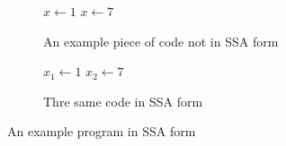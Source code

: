 \begin{figure}[h]
    \begin{subfigure}[b]{0.5\textwidth}
        \centering
        \begin{algorithmic}
            \State $x \gets 1$
            \State {}
            \State $x \gets 7$
            \State {}
        \end{algorithmic}
        \caption{An example piece of code not in SSA form}
    \end{subfigure}
    \begin{subfigure}[b]{0.5\textwidth}
        \centering
        \begin{algorithmic}
            \State $x_1 \gets 1$
            \State {}
            \State $x_2 \gets 7$
            \State {}
        \end{algorithmic}
        \caption{Thre same code in SSA form}
    \end{subfigure}
    \caption{An example program in SSA form}
    \label{fig:basics:SSA-simple}
\end{figure}